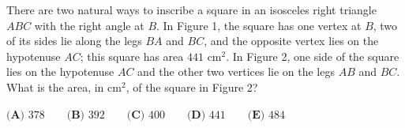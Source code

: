 There are two natural ways to inscribe a square in an isosceles right triangle $ABC$ with the right angle at $B$. In Figure 1, the square has one vertex at $B$, two of its sides lie along the legs $BA$ and $BC$, and the opposite vertex lies on the hypotenuse $AC$; this square has area $441\text{ cm}^2$. In Figure 2, one side of the square lies on the hypotenuse $AC$ and the other two vertices lie on the legs $AB$ and $BC$. What is the area, in $\text{cm}^2$, of the square in Figure 2?

$\textbf{(A) } 378\qquad\textbf{(B) } 392\qquad\textbf{(C) } 400\qquad\textbf{(D) } 441\qquad\textbf{(E) } 484$
